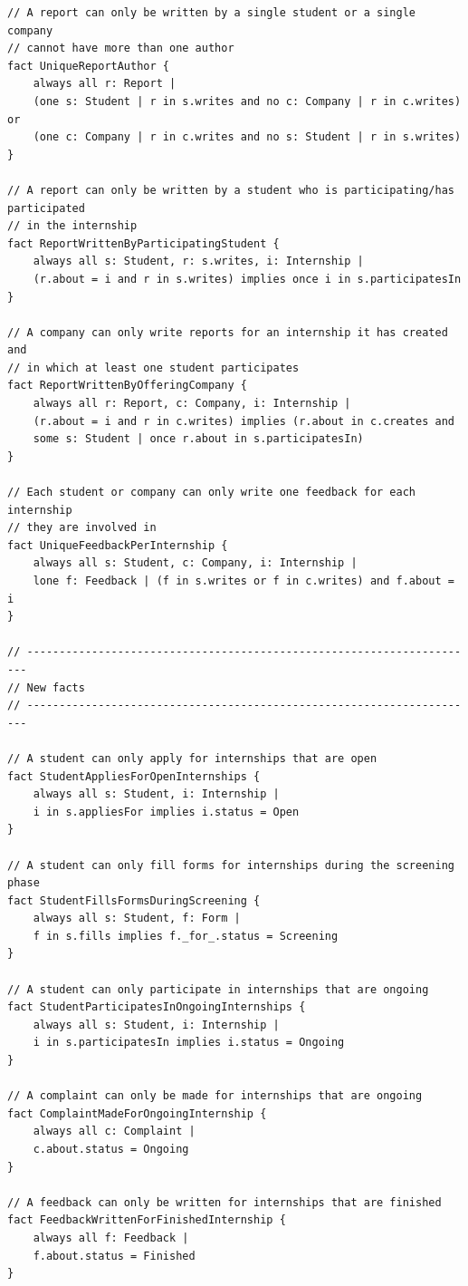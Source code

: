 \documentclass[11pt,twoside]{article}
\begin{document}
{\begin{verbatim}
// A report can only be written by a single student or a single company
// cannot have more than one author
fact UniqueReportAuthor {
    always all r: Report |
    (one s: Student | r in s.writes and no c: Company | r in c.writes) or
    (one c: Company | r in c.writes and no s: Student | r in s.writes)
}

// A report can only be written by a student who is participating/has participated 
// in the internship
fact ReportWrittenByParticipatingStudent {
    always all s: Student, r: s.writes, i: Internship |
    (r.about = i and r in s.writes) implies once i in s.participatesIn
}

// A company can only write reports for an internship it has created and
// in which at least one student participates
fact ReportWrittenByOfferingCompany {
    always all r: Report, c: Company, i: Internship |
    (r.about = i and r in c.writes) implies (r.about in c.creates and
    some s: Student | once r.about in s.participatesIn)
}

// Each student or company can only write one feedback for each internship
// they are involved in
fact UniqueFeedbackPerInternship {
    always all s: Student, c: Company, i: Internship |
    lone f: Feedback | (f in s.writes or f in c.writes) and f.about = i
}

// ----------------------------------------------------------------------
// New facts
// ----------------------------------------------------------------------

// A student can only apply for internships that are open
fact StudentAppliesForOpenInternships {
    always all s: Student, i: Internship |
    i in s.appliesFor implies i.status = Open
}

// A student can only fill forms for internships during the screening phase
fact StudentFillsFormsDuringScreening {
    always all s: Student, f: Form |
    f in s.fills implies f._for_.status = Screening
}

// A student can only participate in internships that are ongoing
fact StudentParticipatesInOngoingInternships {
    always all s: Student, i: Internship |
    i in s.participatesIn implies i.status = Ongoing
}

// A complaint can only be made for internships that are ongoing
fact ComplaintMadeForOngoingInternship {
    always all c: Complaint |
    c.about.status = Ongoing
}

// A feedback can only be written for internships that are finished
fact FeedbackWrittenForFinishedInternship {
    always all f: Feedback |
    f.about.status = Finished
}


\end{verbatim}}
\end{document}
